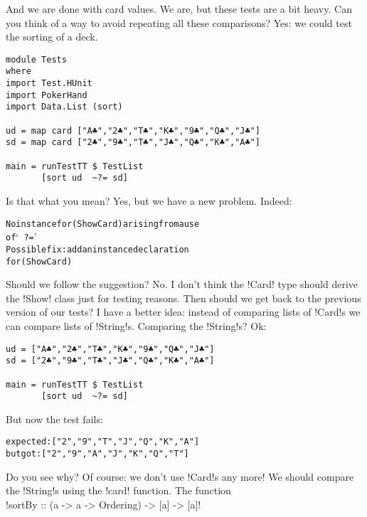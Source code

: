 \success And we are done with card values.
\lhN We are, but these tests are a bit heavy. Can you think of a way to avoid repeating all these comparisons?
\lhA Yes: we could test the sorting of a deck.
\lhN  
\begin{lstlisting}[frame=single]
module Tests
where 
import Test.HUnit
import PokerHand
import Data.List (sort)

ud = map card ["A♣","2♣","T♣","K♣","9♣","Q♣","J♣"]
sd = map card ["2♣","9♣","T♣","J♣","Q♣","K♣","A♣"]

main = runTestTT $ TestList 
       [sort ud  ~?= sd]
\end{lstlisting} %
Is that what you mean?
\lhA \error Yes, but we have a new problem.
\lhN \error Indeed:
\begin{small}
\begin{alltt}
No instance for (Show Card) arising from a use 
of `~?='
Possible fix: add an instance declaration 
for (Show Card)
\end{alltt}
\end{small}
Should we follow the suggestion?
\lhA \error No. I don't think the \il!Card! type should derive the \il!Show! class just for testing reasons.
\lhN Then should we get back to the previous version of our tests?
\lhA I have a better idea: instead of comparing lists of \il!Card!s we can compare lists of \il!String!s.
\lhN \error Comparing the \il!String!s? Ok:
\begin{lstlisting}[frame=single]
ud = ["A♣","2♣","T♣","K♣","9♣","Q♣","J♣"]
sd = ["2♣","9♣","T♣","J♣","Q♣","K♣","A♣"]

main = runTestTT $ TestList 
       [sort ud  ~?= sd]
\end{lstlisting} %
\failure But now the test fails:
\begin{small}
\begin{alltt}
expected: ["2\monoclubs","9\monoclubs","T\monoclubs","J\monoclubs","Q\monoclubs","K\monoclubs","A\monoclubs"]
 but got: ["2\monoclubs","9\monoclubs","A\monoclubs","J\monoclubs","K\monoclubs","Q\monoclubs","T\monoclubs"]
\end{alltt}
\end{small}
Do you see why?
\lhA \failure Of course: we don't use \il!Card!s any more! We should compare the \il!String!s using the \il!card! function. The function \\

\il!sortBy :: (a -> a -> Ordering) -> [a] -> [a]! \\

